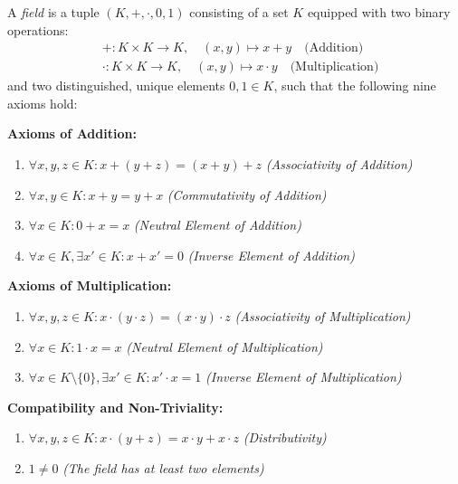 \begin{definition}[Field]
A \textit{field} is a tuple $(K, +, \cdot, 0, 1)$ consisting of a set $K$ equipped with two binary operations:
\begin{align*}
&+: K \times K \rightarrow K, \quad (x, y) \mapsto x + y \quad \text{(Addition)} \\
&\cdot: K \times K \rightarrow K, \quad (x, y) \mapsto x \cdot y \quad \text{(Multiplication)}
\end{align*}
and two distinguished, unique elements $0, 1 \in K$, such that the following nine axioms hold:

\noindent
\textbf{Axioms of Addition:}
\begin{enumerate}
    \item[\textbf{K1}] $\forall x, y, z \in K: x + (y + z) = (x + y) + z$ \hfill \textit{(Associativity of Addition)}
    \item[\textbf{K2}] $\forall x, y \in K: x + y = y + x$ \hfill \textit{(Commutativity of Addition)}
    \item[\textbf{K3}] $\forall x \in K: 0 + x = x$ \hfill \textit{(Neutral Element of Addition)}
    \item[\textbf{K4}] $\forall x \in K, \exists x' \in K: x + x' = 0$ \hfill \textit{(Inverse Element of Addition)}
\end{enumerate}

\noindent
\textbf{Axioms of Multiplication:}
\begin{enumerate}
    \item[\textbf{K5}] $\forall x, y, z \in K: x \cdot (y \cdot z) = (x \cdot y) \cdot z$ \hfill \textit{(Associativity of Multiplication)}
    \item[\textbf{K6}] $\forall x \in K: 1 \cdot x = x$ \hfill \textit{(Neutral Element of Multiplication)}
    \item[\textbf{K7}] $\forall x \in K \setminus \{0\}, \exists x' \in K: x' \cdot x = 1$ \hfill \textit{(Inverse Element of Multiplication)}
\end{enumerate}

\noindent
\textbf{Compatibility and Non-Triviality:}
\begin{enumerate}
    \item[\textbf{K8}] $\forall x, y, z \in K: x \cdot (y + z) = x \cdot y + x \cdot z$ \hfill \textit{(Distributivity)}
    \item[\textbf{K9}] $1 \ne 0$ \hfill \textit{(The field has at least two elements)}
\end{enumerate}
\end{definition}

